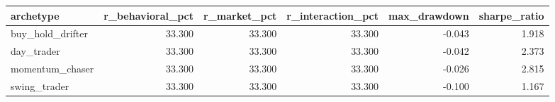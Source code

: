 \begin{tabular}{lrrrrr}
\toprule
archetype & r_behavioral_pct & r_market_pct & r_interaction_pct & max_drawdown & sharpe_ratio \\
\midrule
buy_hold_drifter & 33.300 & 33.300 & 33.300 & -0.043 & 1.918 \\
day_trader & 33.300 & 33.300 & 33.300 & -0.042 & 2.373 \\
momentum_chaser & 33.300 & 33.300 & 33.300 & -0.026 & 2.815 \\
swing_trader & 33.300 & 33.300 & 33.300 & -0.100 & 1.167 \\
\bottomrule
\end{tabular}
